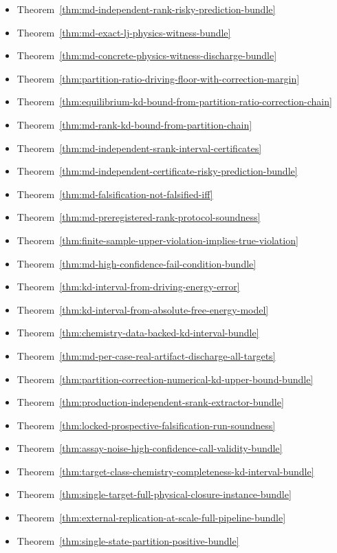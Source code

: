 \begin{itemize}
\item Theorem~\ref{thm:md-independent-rank-risky-prediction-bundle}
\item Theorem~\ref{thm:md-exact-lj-physics-witness-bundle}
\item Theorem~\ref{thm:md-concrete-physics-witness-discharge-bundle}
\item Theorem~\ref{thm:partition-ratio-driving-floor-with-correction-margin}
\item Theorem~\ref{thm:equilibrium-kd-bound-from-partition-ratio-correction-chain}
\item Theorem~\ref{thm:md-rank-kd-bound-from-partition-chain}
\item Theorem~\ref{thm:md-independent-srank-interval-certificates}
\item Theorem~\ref{thm:md-independent-certificate-risky-prediction-bundle}
\item Theorem~\ref{thm:md-falsification-not-falsified-iff}
\item Theorem~\ref{thm:md-preregistered-rank-protocol-soundness}
\item Theorem~\ref{thm:finite-sample-upper-violation-implies-true-violation}
\item Theorem~\ref{thm:md-high-confidence-fail-condition-bundle}
\item Theorem~\ref{thm:kd-interval-from-driving-energy-error}
\item Theorem~\ref{thm:kd-interval-from-absolute-free-energy-model}
\item Theorem~\ref{thm:chemistry-data-backed-kd-interval-bundle}
\item Theorem~\ref{thm:md-per-case-real-artifact-discharge-all-targets}
\item Theorem~\ref{thm:partition-correction-numerical-kd-upper-bound-bundle}
\item Theorem~\ref{thm:production-independent-srank-extractor-bundle}
\item Theorem~\ref{thm:locked-prospective-falsification-run-soundness}
\item Theorem~\ref{thm:assay-noise-high-confidence-call-validity-bundle}
\item Theorem~\ref{thm:target-class-chemistry-completeness-kd-interval-bundle}
\item Theorem~\ref{thm:single-target-full-physical-closure-instance-bundle}
\item Theorem~\ref{thm:external-replication-at-scale-full-pipeline-bundle}
\item Theorem~\ref{thm:single-state-partition-positive-bundle}

\end{itemize}
